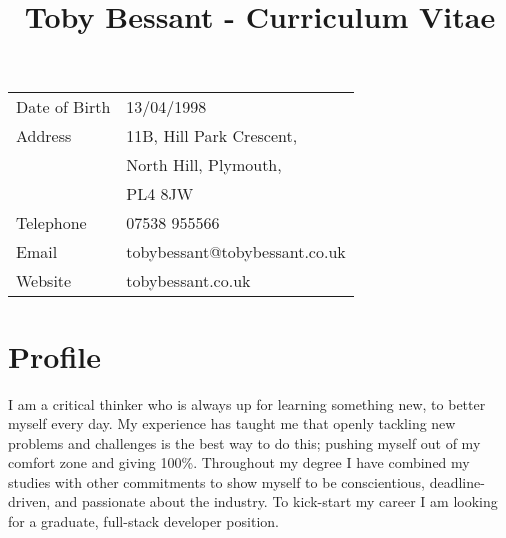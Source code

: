 \documentclass[1pt]{article}
\title{\bfseries\Huge Toby Bessant - Curriculum Vitae\vspace{-1.5em}}
\date{}
\begin{document}
\maketitle
\thispagestyle{fancy}
\begin{center}
\begin{tabular}[]{ll}
Date of Birth & 13/04/1998\\
Address        & 11B, Hill Park Crescent,\\ & North Hill, Plymouth,\\ & PL4 8JW \\ 
Telephone     &07538 955566\\
Email            & tobybessant@tobybessant.co.uk\\
Website        & tobybessant.co.uk\\
\end{tabular}
\end{center}
 
\section*{Profile}
I am a critical thinker who is always up for learning something new, to better myself every day. My experience has taught me that openly tackling new problems 
and challenges is the best way to do this; pushing myself out of my comfort zone and giving 100\%. Throughout my degree I have combined my studies with 
other commitments to show myself to be conscientious, deadline-driven, and passionate about the industry. To kick-start my career I am looking for a graduate, 
full-stack developer position.
 
\end{document}
